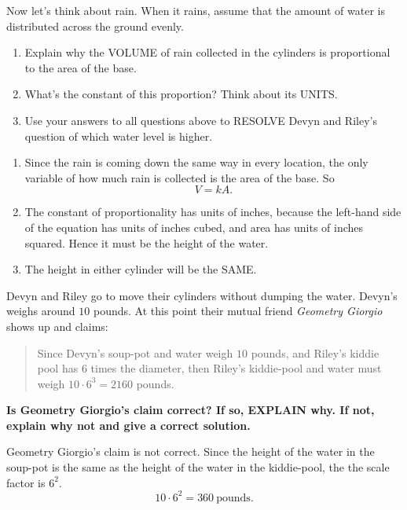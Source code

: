 \documentclass[nooutcomes,noauthor,hints,handout,12pt]{ximera}
\begin{document}
\begin{question}
  Now let's think about rain. When it rains, assume that the amount of
  water is distributed across the ground evenly.
  \begin{enumerate}
  \item Explain why the VOLUME of rain collected in the cylinders is
    proportional to the area of the base.
  \item What's the constant of this proportion? Think about its UNITS.
  \item Use your answers to all questions above to RESOLVE Devyn and
    Riley's question of which water level is higher.
  \end{enumerate}
  \begin{freeResponse}
    \begin{enumerate}
    \item Since the rain is coming down the same way in every
      location, the only variable of how much rain is collected is the
      area of the base. So
      \[
      V= k A.
      \]
    \item The constant of proportionality has units of inches, because
      the left-hand side of the equation has units of inches cubed,
      and area has units of inches squared. Hence it must be the height
      of the water.
    \item The height in either cylinder will be the SAME. 
    \end{enumerate}
  \end{freeResponse}
\end{question}
\mynewpage



\begin{question}
  Devyn and Riley go to move their cylinders without dumping the
  water. Devyn's weighs around $10$ pounds. At this point their mutual
  friend \textit{Geometry Giorgio} shows up and claims:
  \begin{quote}
    Since Devyn's soup-pot and water weigh $10$ pounds, and Riley's
    kiddie pool has $6$ times the diameter, then Riley's kiddie-pool
    and water must weigh $10\cdot 6^3 = 2160$ pounds.
  \end{quote}
  \textbf{Is Geometry Giorgio’s claim correct?  If so, EXPLAIN why. If
    not, explain why not and give a correct solution.}
  \begin{freeResponse}
    Geometry Giorgio’s claim is not correct. Since the height of the
    water in the soup-pot is the same as the height of the water in
    the kiddie-pool, the the scale factor is $6^2$.
    \[
    10\cdot 6^2=360~\text{pounds}.
    \]
  \end{freeResponse}
\end{question}
\end{document}
